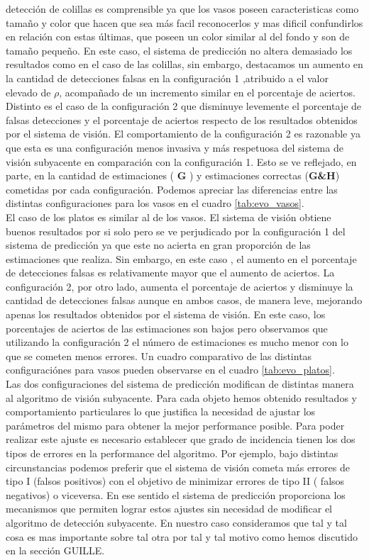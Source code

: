 detección de colillas es comprensible ya que los vasos poseen 
caracteristicas como tamaño y color que hacen que sea más facil 
reconocerlos y mas dificil confundirlos en relación con estas 
últimas, que poseen un color similar al del fondo y son de tamaño 
pequeño. En este caso, el sistema de predicción no altera demasiado 
los resultados como en el caso de las colillas, sin embargo, destacamos un 
aumento en la cantidad de detecciones falsas en la configuración 1 
,atribuido a el valor elevado de $\rho$, acompañado de un incremento 
similar en el porcentaje de aciertos. Distinto es el caso de 
la configuración 2 que disminuye levemente el porcentaje de falsas 
detecciones y el porcentaje de aciertos respecto de los resultados
obtenidos por el sistema de visión. El comportamiento de la 
configuración 2 es razonable ya que esta es una configuración menos 
invasiva y más respetuosa del sistema de visión subyacente en 
comparación con la configuración 1. Esto se ve reflejado, en parte, 
en la cantidad de estimaciones ( \textbf{G} ) y estimaciones correctas 
(\textbf{G\&H}) cometidas por cada configuración. Podemos 
apreciar las diferencias entre las distintas configuraciones para los 
vasos en el cuadro \ref{tab:evo_vasos}.\\
\indent El caso de los platos es similar al de los vasos. El sistema de visión 
obtiene buenos resultados por si solo pero se ve perjudicado por la configuración 1 del sistema de 
predicción ya que este no acierta en gran proporción de las estimaciones que realiza. 
Sin embargo, en este caso , el aumento en el porcentaje de detecciones 
falsas es relativamente mayor que el aumento de aciertos. 
La configuración 2, por otro lado, aumenta el 
porcentaje de aciertos y disminuye la cantidad de detecciones falsas 
aunque en ambos casos, de manera leve, mejorando apenas los resultados 
obtenidos por el sistema de visión. En este caso, los porcentajes de 
aciertos de las estimaciones son bajos pero observamos que utilizando 
la configuración 2 el número de estimaciones es mucho menor con lo 
que se cometen menos errores. Un cuadro comparativo de las 
distintas configuraciónes para vasos pueden observarse en el cuadro 
\ref{tab:evo_platos}.\\
\indent  Las dos configuraciones del sistema de predicción modifican de 
distintas manera al algoritmo de visión subyacente. Para cada objeto 
hemos obtenido resultados y comportamiento particulares lo que 
justifica la necesidad de ajustar los parámetros del mismo para obtener la mejor 
performance posible. Para poder realizar este ajuste es necesario 
establecer que grado de incidencia tienen los dos tipos de errores en la performance del
algoritmo. Por ejemplo, bajo distintas circunstancias podemos preferir que el  
sistema de visión cometa más errores de tipo I (falsos positivos) con 
el objetivo de minimizar errores de tipo II ( falsos negativos) o 
viceversa. En ese sentido el sistema de predicción proporciona los mecanismos que 
permiten lograr estos ajustes sin necesidad de modificar el algoritmo de detección 
subyacente. En nuestro caso consideramos que tal y tal cosa es mas 
importante sobre tal otra por tal y tal motivo como hemos discutido en 
la sección GUILLE.
 

